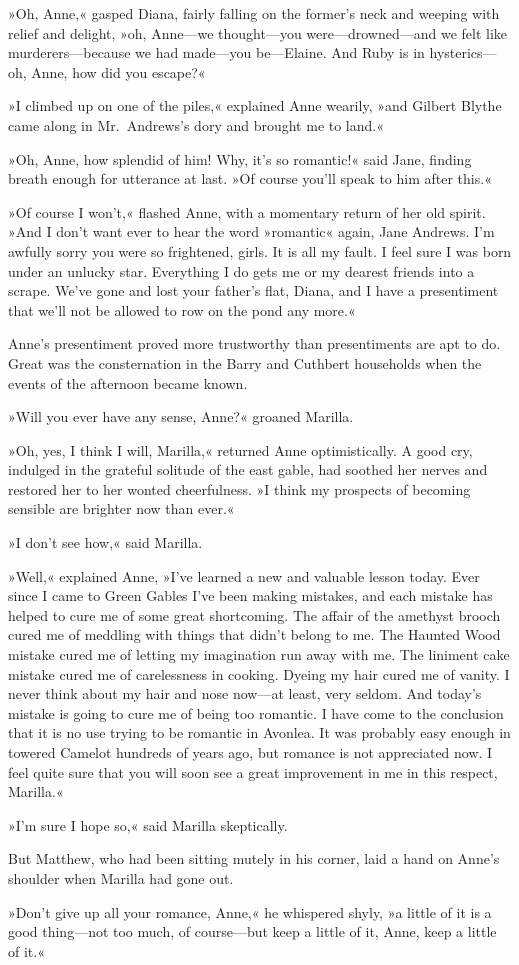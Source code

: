 »Oh, Anne,« gasped Diana, fairly falling on the former's neck and weeping with relief and delight, »oh, Anne—we thought—you were—drowned—and we felt like murderers—because we had made—you be—Elaine. And Ruby is in hysterics—oh, Anne, how did you escape?«

»I climbed up on one of the piles,« explained Anne wearily, »and Gilbert Blythe came along in Mr.~Andrews's dory and brought me to land.«

»Oh, Anne, how splendid of him! Why, it's so romantic!« said Jane, finding breath enough for utterance at last. »Of course you'll speak to him after this.«

»Of course I won't,« flashed Anne, with a momentary return of her old spirit. »And I don't want ever to hear the word »romantic« again, Jane Andrews. I'm awfully sorry you were so frightened, girls. It is all my fault. I feel sure I was born under an unlucky star. Everything I do gets me or my dearest friends into a scrape. We've gone and lost your father's flat, Diana, and I have a presentiment that we'll not be allowed to row on the pond any more.«

Anne's presentiment proved more trustworthy than presentiments are apt to do. Great was the consternation in the Barry and Cuthbert households when the events of the afternoon became known.

»Will you ever have any sense, Anne?« groaned Marilla.

»Oh, yes, I think I will, Marilla,« returned Anne optimistically. A good cry, indulged in the grateful solitude of the east gable, had soothed her nerves and restored her to her wonted cheerfulness. »I think my prospects of becoming sensible are brighter now than ever.«

»I don't see how,« said Marilla.

»Well,« explained Anne, »I've learned a new and valuable lesson today. Ever since I came to Green Gables I've been making mistakes, and each mistake has helped to cure me of some great shortcoming. The affair of the amethyst brooch cured me of meddling with things that didn't belong to me. The Haunted Wood mistake cured me of letting my imagination run away with me. The liniment cake mistake cured me of carelessness in cooking. Dyeing my hair cured me of vanity. I never think about my hair and nose now—at least, very seldom. And today's mistake is going to cure me of being too romantic. I have come to the conclusion that it is no use trying to be romantic in Avonlea. It was probably easy enough in towered Camelot hundreds of years ago, but romance is not appreciated now. I feel quite sure that you will soon see a great improvement in me in this respect, Marilla.«

»I'm sure I hope so,« said Marilla skeptically.

But Matthew, who had been sitting mutely in his corner, laid a hand on Anne's shoulder when Marilla had gone out.

»Don't give up all your romance, Anne,« he whispered shyly, »a little of it is a good thing—not too much, of course—but keep a little of it, Anne, keep a little of it.«